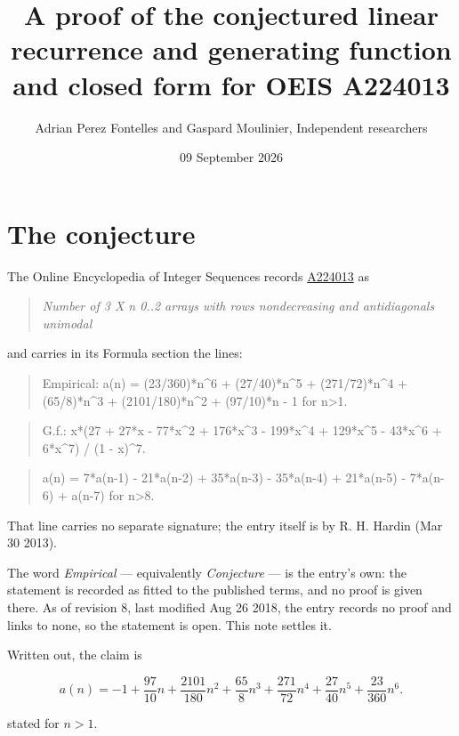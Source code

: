 \documentclass[11pt]{article}
\title{A proof of the conjectured linear recurrence and generating function and closed form for OEIS A224013}
\author{Adrian Perez Fontelles and Gaspard Moulinier, Independent researchers}
\date{09 September 2026}
\theoremstyle{definition}
\begin{document}
\maketitle
\section{The conjecture}

The Online Encyclopedia of Integer Sequences records \href{https://oeis.org/A224013}{A224013} as

\begin{quote}\itshape Number of 3 X n 0..2 arrays with rows nondecreasing and antidiagonals unimodal\end{quote}

and carries in its Formula section the lines:

\begin{quote}\ttfamily Empirical: a(n) = (23/360)*n\textasciicircum{}6 + (27/40)*n\textasciicircum{}5 + (271/72)*n\textasciicircum{}4 + (65/8)*n\textasciicircum{}3 + (2101/180)*n\textasciicircum{}2 + (97/10)*n - 1 for n>1.\end{quote}

\begin{quote}\ttfamily G.f.: x*(27 + 27*x - 77*x\textasciicircum{}2 + 176*x\textasciicircum{}3 - 199*x\textasciicircum{}4 + 129*x\textasciicircum{}5 - 43*x\textasciicircum{}6 + 6*x\textasciicircum{}7) / (1 - x)\textasciicircum{}7.\end{quote}

\begin{quote}\ttfamily a(n) = 7*a(n-1) - 21*a(n-2) + 35*a(n-3) - 35*a(n-4) + 21*a(n-5) - 7*a(n-6) + a(n-7) for n>8.\end{quote}

That line carries no separate signature; the entry itself is by R. H. Hardin (Mar 30 2013).

The word {\itshape Empirical} --- equivalently {\itshape Conjecture} --- is the entry's own: the statement is recorded as fitted to the published terms, and no proof is given there. As of revision 8, last modified Aug 26 2018, the entry records no proof and links to none, so the statement is open. This note settles it.

Written out, the claim is

\[a(n) = -1 + \frac{97}{10}n + \frac{2101}{180}n^{2} + \frac{65}{8}n^{3} + \frac{271}{72}n^{4} + \frac{27}{40}n^{5} + \frac{23}{360}n^{6}.\]

stated for $n > 1$.
\end{document}

